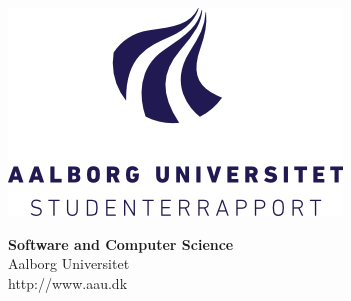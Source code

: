 \thispagestyle{empty}

\begin{minipage}{0.7\textwidth}
\hspace{-1cm}\includegraphics[scale=1.3]{Images/Logo.png}
\end{minipage}
\begin{minipage}{0.3\textwidth}
\textbf{Software and Computer Science} \\
\hspace*{0.3cm}Aalborg Universitet \\
http://www.aau.dk
\end{minipage}

